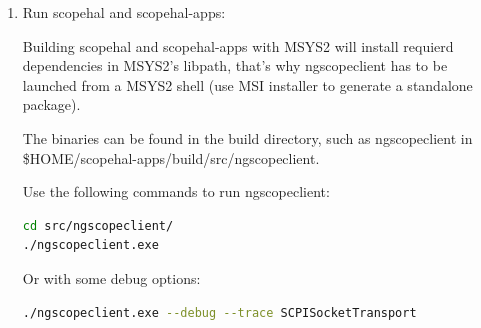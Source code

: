 \begin{enumerate}








\item Run scopehal and scopehal-apps:

Building scopehal and scopehal-apps with MSYS2 will install requierd dependencies in MSYS2's libpath, that's why ngscopeclient has to be launched from a MSYS2 shell (use MSI installer to generate a standalone package).

The binaries can be found in the build directory, such as ngscopeclient in \$HOME/scopehal-apps/build/src/ngscopeclient.

Use the following commands to run ngscopeclient:
\begin{lstlisting}[language=sh, numbers=none]
cd src/ngscopeclient/
./ngscopeclient.exe
\end{lstlisting}

Or with some debug options:
\begin{lstlisting}[language=sh, numbers=none]
./ngscopeclient.exe --debug --trace SCPISocketTransport
\end{lstlisting}



\end{enumerate}


